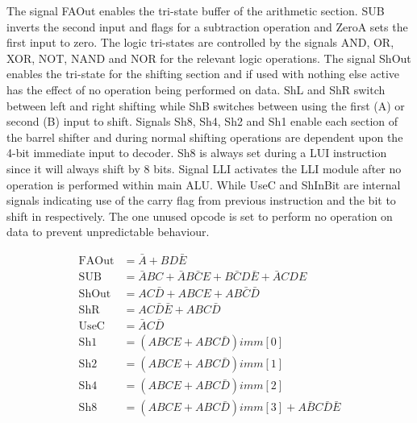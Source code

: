 The signal FAOut enables the tri-state buffer of the arithmetic section. SUB inverts the second input and flags for a subtraction operation and ZeroA sets the first input to zero. The logic tri-states are controlled by the signals AND, OR, XOR, NOT, NAND and NOR for the relevant logic operations. The signal ShOut enables the tri-state for the shifting section and if used with nothing else active has the effect of no operation being performed on data. ShL and ShR switch between left and right shifting while ShB switches between using the first (A) or second (B) input to shift. Signals Sh8, Sh4, Sh2 and Sh1 enable each section of the barrel shifter and during normal shifting operations are dependent upon the 4-bit immediate input to decoder. Sh8 is always set during a LUI instruction since it will always shift by 8 bits. Signal LLI activates the LLI module after no operation is performed within main ALU. While UseC and ShInBit are internal signals indicating use of the carry flag from previous instruction and the bit to shift in respectively. The one unused opcode is set to perform no operation on data to prevent unpredictable behaviour. 

\begin{align}
	\text{FAOut} &= \bar{A} + BD\bar{E} \label{eq:DecBasicS}\\
	\text{SUB} &= \bar{A}BC + \bar{A}B\bar{C}E + B\bar{C}D\bar{E} + \bar{A}CDE \\
	\text{ShOut} &= AC\bar{D} + ABCE + AB\bar{C}\bar{D} \\
	\text{ShR} &= AC\bar{D}\bar{E} + ABC\bar{D} \\
	\text{UseC} &= \bar{A}C\bar{D} \\
	\text{Sh1} &= (ABCE + ABC\bar{D})imm[0] \\
	\text{Sh2} &= (ABCE + ABC\bar{D})imm[1] \\
	\text{Sh4} &= (ABCE + ABC\bar{D})imm[2] \\
	\text{Sh8} &= (ABCE + ABC\bar{D})imm[3] + A\bar{B}C\bar{D}\bar{E} \label{eq:DecBasicF}
\end{align}

